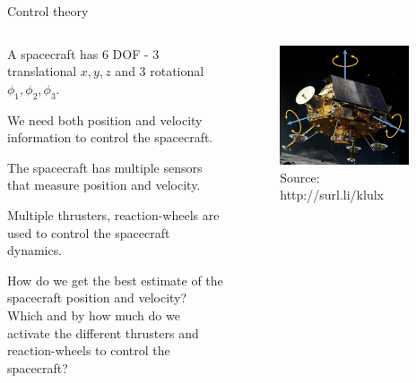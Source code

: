\documentclass[aspectratio=169]{beamer}
\begin{document}
\begin{frame}{Control theory}
  \begin{columns}
    \begin{column}{0.5\textwidth}
      \vspace{0.2cm}
      A spacecraft has 6 DOF - 3 translational $x, y, z$ and 3 rotational $\phi_1, \phi_2, \phi_3$.

      We need both position and velocity information to control the spacecraft.
      \vspace{0.2cm}
      
      The spacecraft has multiple sensors that measure position and velocity.
      \vspace{0.2cm}
      
      Multiple thrusters, reaction-wheels are used to control the spacecraft dynamics.
      \vspace{0.2cm}

      How do we get the best estimate of the spacecraft position and velocity? Which and by how much do we activate the different thrusters and reaction-wheels to control the spacecraft?
    \end{column}
    \begin{column}{0.475\textwidth}
      \begin{figure}
        \centering
        \includegraphics[width=0.9\textwidth]{spacecraft.png}
        \caption{\scriptsize Source: http://surl.li/klulx}
      \end{figure}
    \end{column}    
  \end{columns}
\end{frame}
\end{document}
